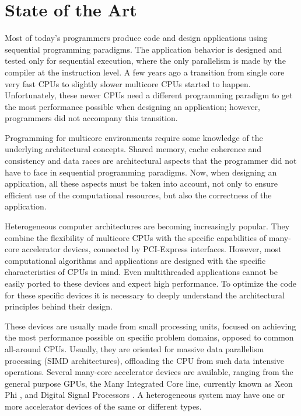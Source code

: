 
\chapter{State of the Art}

Most of today’s programmers produce code and design applications using sequential programming paradigms. The application behavior is designed and tested only for sequential execution, where the only parallelism is made by the compiler at the instruction level. A few years ago a transition from single core very fast CPUs to slightly slower multicore CPUs started to happen. Unfortunately, these newer CPUs need a different programming paradigm to get the most performance possible when designing an application; however, programmers did not accompany this transition.

Programming for multicore environments require some knowledge of the underlying architectural concepts. Shared memory, cache coherence and consistency and data races are architectural aspects that the programmer did not have to face in sequential programming paradigms. Now, when designing an application, all these aspects must be taken into account, not only to ensure efficient use of the computational resources, but also the correctness of the application.

Heterogeneous computer architectures are becoming increasingly popular. They combine the flexibility of multicore CPUs with the specific capabilities of many-core accelerator devices, connected by PCI-Express interfaces. However, most computational algorithms and applications are designed with the specific characteristics of CPUs in mind. Even multithreaded applications cannot be easily ported to these devices and expect high performance. To optimize the code for these specific devices it is necessary to deeply understand the architectural principles behind their design.

These devices are usually made from small processing units, focused on achieving the most performance possible on specific problem domains, opposed to common all-around CPUs. Usually, they are oriented for massive data parallelism processing (SIMD architectures), offloading the CPU from such data intensive operations. Several many-core accelerator devices are available, ranging from the general purpose GPUs, the \intel Many Integrated Core line, currently known as \intel Xeon Phi \cite{Intel:MIC}, and Digital Signal Processors \cite{Texas:DSP}. A heterogeneous system may have one or more accelerator devices of the same or different types.

